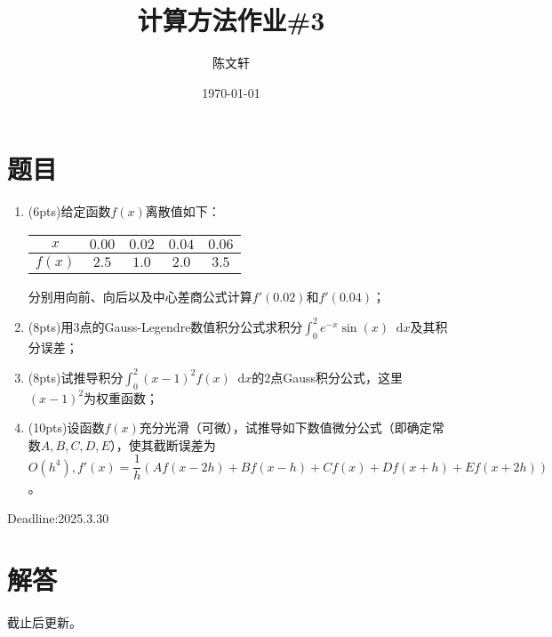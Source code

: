 \documentclass[cn,hazy,green,11pt,normal]{elegantnote}
\title{计算方法作业\#3}
\author{陈文轩}
\institute{KFRC}
\date{\today}
\newcommand*{\diff}{\mathop{}\!\mathrm{d}}
\begin{document}
\maketitle


\section{题目}
    \begin{enumerate}
        \item (6pts)给定函数$f(x)$离散值如下：
            \begin{table}[H]
                \begin{center}
                    \begin{tabular}{|c|c|c|c|c|}
                    \hline
                    $x$ & $0.00$ & $0.02$ & $0.04$ & $0.06$ \\
                    \hline
                    $f(x)$ & $2.5$ & $1.0$ & $2.0$ & $3.5$ \\
                    \hline
                    \end{tabular}
                \end{center}
            \end{table}
            分别用向前、向后以及中心差商公式计算$f'(0.02)$和$f'(0.04)$；
        \item (8pts)用$3$点的Gauss-Legendre数值积分公式求积分$\int_0^2 e^{-x}\sin(x)\diff x$及其积分误差；
        \item (8pts)试推导积分$\int_0^2 (x-1)^2 f(x)\diff x$的$2$点Gauss积分公式，这里$(x-1)^2$为权重函数；
        \item (10pts)设函数$f(x)$充分光滑（可微），试推导如下数值微分公式（即确定常数$A,B,C,D,E$），使其截断误差为$O(h^4),f'(x)=\dfrac1h (Af(x-2h)+Bf(x-h)+Cf(x)+Df(x+h)+Ef(x+2h))$。

    \end{enumerate}

    Deadline:2025.3.30

\section{解答}

    截止后更新。
\end{document}
